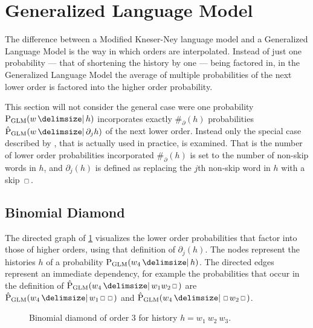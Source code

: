 \section{Generalized Language Model}

The difference between a Modified Kneser-Ney language model and a
Generalized Language Model is the way in which orders are interpolated.
Instead of just one probability --- that of shortening the history by one ---
being factored in, in the Generalized Language Model the average of multiple
probabilities of the next lower order is factored into the higher order
probability.

This section will not consider the general case were one probability
$\ProbGLM{w}{h}$ incorporates exactly $\#_\partial(h)$ probabilities
$\ProbGLM*{w}{\partial_j h}$ of the next lower order.
Instead only the special case described by \textcite{Pickhardt2014}, that is
actually used in practice, is examined.
That is the number of lower order probabilities incorporated $\#_\partial(h)$
is set to the number of non-skip words in $h$, and $\partial_j(h)$ is defined as
replacing the $j$th non-skip word in $h$ with a skip $\Skp$.

\subsection{Binomial Diamond}


The directed graph of \cref{fig:history-glm} visualizes the lower order
probabilities that factor into those of higher orders, using that definition of
$\partial_j(h)$.
The nodes represent the histories $h$ of a probability $\ProbGLM{w_4}{h}$.
The directed edges represent an immediate dependency, for example the
probabilities that occur in the definition of
$\ProbGLM*{w_4}{w_1 w_2 \Skp}$ are $\ProbGLM*{w_4}{w_1 \Skp \Skp}$ and
$\ProbGLM*{w_4}{\Skp w_2 \Skp}$.

\begin{figure}
  \centering
  
  \caption{
    Binomial diamond of order 3 for history $h = w_1 \: w_2 \: w_3$.
  }
  \label{fig:history-glm}
\end{figure}

